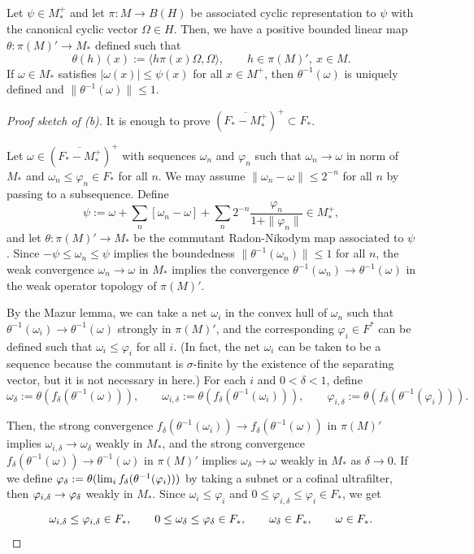 \documentclass{../../../../small}
\begin{document}
\begin{definition*}
Let $\psi\in M_*^+$ and let $\pi:M\to B(H)$ be associated cyclic representation to $\psi$ with the canonical cyclic vector $\Omega\in H$.
Then, we have a positive bounded linear map $\theta:\pi(M)'\to M_*$ defined such that
\[\theta(h)(x):=\langle h\pi(x)\Omega,\Omega\rangle,\qquad h\in\pi(M)',\ x\in M.\]
If $\omega\in M_*$ satisfies $|\omega(x)|\le\psi(x)$ for all $x\in M^+$, then $\theta^{-1}(\omega)$ is uniquely defined and $\|\theta^{-1}(\omega)\|\le1$.
\end{definition*}

\begin{proof}[Proof sketch of (b)]
It is enough to prove $(\overline{F_*-M_*^+})^+\subset F_*$.

Let $\omega\in(\overline{F_*-M_*^+})^+$ with sequences $\omega_n$ and $\varphi_n$ such that $\omega_n\to\omega$ in norm of $M_*$ and $\omega_n\le\varphi_n\in F_*$ for all $n$.
We may assume $\|\omega_n-\omega\|\le2^{-n}$ for all $n$ by passing to a subsequence.
Define
\[\psi:=\omega+\sum_n[\omega_n-\omega]+\sum_n2^{-n}\frac{\varphi_n}{1+\|\varphi_n\|}\in M_*^+,\]
and let $\theta:\pi(M)'\to M_*$ be the commutant Radon-Nikodym map associated to $\psi$.
Since $-\psi\le\omega_n\le\psi$ implies the boundedness $\|\theta^{-1}(\omega_n)\|\le1$ for all $n$, the weak convergence $\omega_n\to\omega$ in $M_*$ implies the convergence $\theta^{-1}(\omega_n)\to\theta^{-1}(\omega)$ in the weak operator topology of $\pi(M)'$.

By the Mazur lemma, we can take a net $\omega_i$ in the convex hull of $\omega_n$ such that $\theta^{-1}(\omega_i)\to\theta^{-1}(\omega)$ strongly in $\pi(M)'$, and the corresponding $\varphi_i\in F^*$ can be defined such that $\omega_i\le\varphi_i$ for all $i$.
(In fact, the net $\omega_i$ can be taken to be a sequence because the commutant is $\sigma$-finite by the existence of the separating vector, but it is not necessary in here.)
For each $i$ and $0<\delta<1$, define
\[\omega_\delta:=\theta(f_\delta(\theta^{-1}(\omega))),\qquad\omega_{i,\delta}:=\theta(f_\delta(\theta^{-1}(\omega_i))),\qquad\varphi_{i,\delta}:=\theta(f_\delta(\theta^{-1}(\varphi_i))).\]

Then, the strong convergence $f_\delta(\theta^{-1}(\omega_i))\to f_\delta(\theta^{-1}(\omega))$ in $\pi(M)'$ implies $\omega_{i,\delta}\to\omega_\delta$ weakly in $M_*$, and the strong convergence $f_\delta(\theta^{-1}(\omega))\to\theta^{-1}(\omega)$ in $\pi(M)'$ implies $\omega_\delta\to\omega$ weakly in $M_*$ as $\delta\to0$.
If we define $\varphi_\delta:=\theta(\lim_if_\delta(\theta^{-1}(\varphi_i)))$ by taking a subnet or a cofinal ultrafilter, then $\varphi_{i,\delta}\to\varphi_\delta$ weakly in $M_*$.
Since $\omega_i\le\varphi_i$ and $0\le\varphi_{i,\delta}\le\varphi_i\in F_*$, we get
\[\omega_{i,\delta}\le\varphi_{i,\delta}\in F_*,\qquad 0\le\omega_\delta\le\varphi_\delta\in F_*,\qquad\omega_\delta\in F_*,\qquad\omega\in F_*.\qedhere\]
\end{proof}
\end{document}
